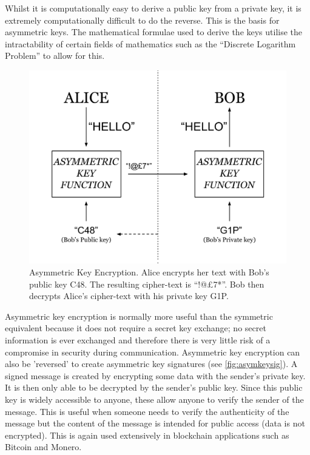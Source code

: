 \documentclass{article}
\begin{document}
Whilst it is computationally easy to derive a public key from a private key, it is extremely computationally difficult to do the reverse. This is the basis for asymmetric keys. The mathematical formulae used to derive the keys utilise the intractability of certain fields of mathematics such as the ``Discrete Logarithm Problem'' to allow for this.

\begin{figure}[H]
    \centering
    \includegraphics[width=0.6\linewidth]{Images/Diagrams/asymmetric_key_encryption.png}
    \caption{Asymmetric Key Encryption. Alice encrypts her text with Bob's public key C48. The resulting cipher-text is ``!@£7*''. Bob then decrypts Alice's cipher-text with his private key G1P.}
    \label{fig:asymkeyenc}
\end{figure}

Asymmetric key encryption is normally more useful than the symmetric equivalent because it does not require a secret key exchange; no secret information is ever exchanged and therefore there is very little risk of a compromise in security during communication.
Asymmetric key encryption can also be 'reversed' to create asymmetric key signatures (see \autoref{fig:asymkeysig}). A signed message is created by encrypting some data with the sender's private key. It is then only able to be decrypted by the sender's public key. Since this public key is widely accessible to anyone, these allow anyone to verify the sender of the message. This is useful when someone needs to verify the authenticity of the message but the content of the message is intended for public access (data is not encrypted). This is again used extensively in blockchain applications such as Bitcoin and Monero.
\end{document}
